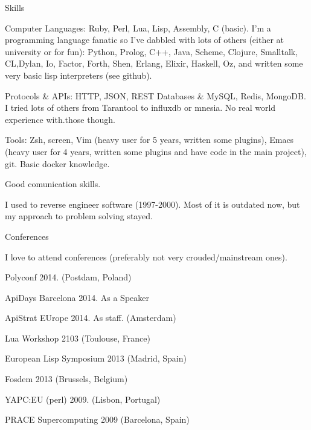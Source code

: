 \documentclass{resume} %
\begin{document}

\begin{rSection}{Skills}

\item Computer Languages: Ruby, Perl, Lua, Lisp, Assembly, C (basic). I'm a programming language fanatic so I've dabbled with lots of others  (either at university or for fun): Python, Prolog, C++, Java, Scheme, Clojure, Smalltalk, CL,Dylan, Io, Factor, Forth, Shen, Erlang, Elixir, Haskell, Oz, and written some very basic lisp interpreters (see github).

\item Protocols \& APIs: HTTP, JSON, REST Databases \& MySQL, Redis,
  MongoDB. I tried lots of others from Tarantool to influxdb or
  mnesia. No real world experience with.those though.
\item Tools: Zsh, screen, Vim (heavy user for 5 years, written some
  plugins), Emacs (heavy user for 4 years, written some plugins and
  have code in the main project), git. Basic docker knowledge.
\item Good comunication skills.
\item I used to reverse engineer software (1997-2000). Most of it is
  outdated now, but my approach to problem solving stayed.

\end{rSection}

\begin{rSection}{Conferences}

  I love to attend conferences (preferably not very crouded/mainstream ones).

\item Polyconf 2014. (Postdam, Poland)
\item ApiDays Barcelona 2014. As a Speaker
\item ApiStrat EUrope 2014. As staff. (Amsterdam)
\item Lua Workshop 2103 (Toulouse, France)
\item European Lisp Symposium 2013 (Madrid, Spain)
\item Fosdem 2013 (Brussels, Belgium)
\item YAPC:EU (perl) 2009. (Lisbon, Portugal)
\item PRACE Supercomputing 2009 (Barcelona, Spain)

\end{rSection}
\end{document}
